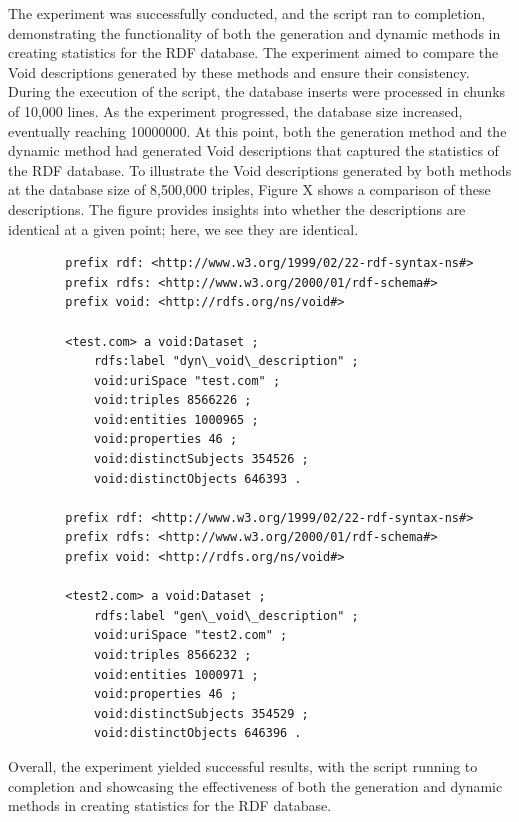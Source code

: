The experiment was successfully conducted, and the script ran to completion, demonstrating the functionality of both the generation and dynamic methods in creating statistics for the RDF database. The experiment aimed to compare the Void descriptions generated by these methods and ensure their consistency.
During the execution of the script, the database inserts were processed in chunks of 10,000 lines. As the experiment progressed, the database size increased, eventually reaching 10000000. At this point, both the generation method and the dynamic method had generated Void descriptions that captured the statistics of the RDF database.
To illustrate the Void descriptions generated by both methods at the database size of 8,500,000 triples, Figure X shows a comparison of these descriptions. The figure provides insights into whether the descriptions are identical at a given point; here, we see they are identical.
\begin{listing}[!ht]
    \begin{verbatim}
        prefix rdf: <http://www.w3.org/1999/02/22-rdf-syntax-ns#>
        prefix rdfs: <http://www.w3.org/2000/01/rdf-schema#>
        prefix void: <http://rdfs.org/ns/void#>
        
        <test.com> a void:Dataset ;
            rdfs:label "dyn\_void\_description" ;
            void:uriSpace "test.com" ;
            void:triples 8566226 ;
            void:entities 1000965 ;
            void:properties 46 ;
            void:distinctSubjects 354526 ;
            void:distinctObjects 646393 .
        
        prefix rdf: <http://www.w3.org/1999/02/22-rdf-syntax-ns#>
        prefix rdfs: <http://www.w3.org/2000/01/rdf-schema#>
        prefix void: <http://rdfs.org/ns/void#>
        
        <test2.com> a void:Dataset ;
            rdfs:label "gen\_void\_description" ;
            void:uriSpace "test2.com" ;
            void:triples 8566232 ;
            void:entities 1000971 ;
            void:properties 46 ;
            void:distinctSubjects 354529 ;
            void:distinctObjects 646396 .
    \end{verbatim}
\end{listing}
Overall, the experiment yielded successful results, with the script running to completion and showcasing the effectiveness of both the generation and dynamic methods in creating statistics for the RDF database. 










